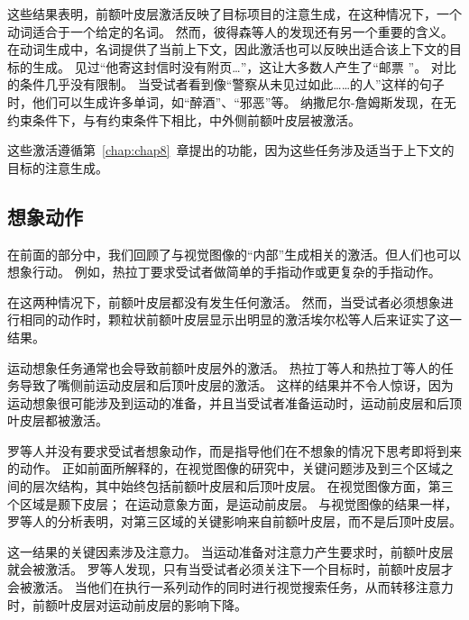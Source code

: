 这些结果表明，前额叶皮层激活反映了目标项目的注意生成，在这种情况下，一个动词适合于一个给定的名词。
然而，彼得森等人的发现还有另一个重要的含义。
在动词生成中，名词提供了当前上下文，因此激活也可以反映出适合该上下文的目标的生成。
见过“他寄这封信时没有附页…”，这让大多数人产生了“邮票 ”。
对比的条件几乎没有限制。
当受试者看到像“警察从未见过如此……的人”这样的句子时，他们可以生成许多单词，如“醉酒”、“邪恶”等。
纳撒尼尔-詹姆斯发现，在无约束条件下，与有约束条件下相比，中外侧前额叶皮层被激活。
\par


这些激活遵循第~\ref{chap:chap8}~章提出的功能，因为这些任务涉及适当于上下文的目标的注意生成。



\subsection{想象动作}

在前面的部分中，我们回顾了与视觉图像的“内部”生成相关的激活。但人们也可以想象行动。
例如，热拉丁\cite{gerardin2000partially}要求受试者做简单的手指动作或更复杂的手指动作。
\par


在这两种情况下，前额叶皮层都没有发生任何激活。
然而，当受试者必须想象进行相同的动作时，颗粒状前额叶皮层显示出明显的激活埃尔松等人\cite{ehrsson2003imagery}后来证实了这一结果。
\par


运动想象任务通常也会导致前额叶皮层外的激活。
热拉丁等人和热拉丁等人的任务导致了嘴侧前运动皮层和后顶叶皮层的激活。
这样的结果并不令人惊讶，因为运动想象很可能涉及到运动的准备\cite{jeannerod2006motor}，并且当受试者准备运动时，运动前皮层和后顶叶皮层都被激活\cite{toni2002multiple}。
\par


罗等人\cite{rowe2002attention}并没有要求受试者想象动作，而是指导他们在不想象的情况下思考即将到来的动作。
正如前面所解释的，在视觉图像的研究中，关键问题涉及到三个区域之间的层次结构，其中始终包括前额叶皮层和后顶叶皮层。
在视觉图像方面，第三个区域是颞下皮层；
在运动意象方面，是运动前皮层。
与视觉图像的结果一样，罗等人的分析表明，对第三区域的关键影响来自前额叶皮层，而不是后顶叶皮层。
\par


这一结果的关键因素涉及注意力。
当运动准备对注意力产生要求时，前额叶皮层就会被激活。
罗等人发现，只有当受试者必须关注下一个目标时，前额叶皮层才会被激活。
当他们在执行一系列动作的同时进行视觉搜索任务，从而转移注意力时，前额叶皮层对运动前皮层的影响下降。
\par


